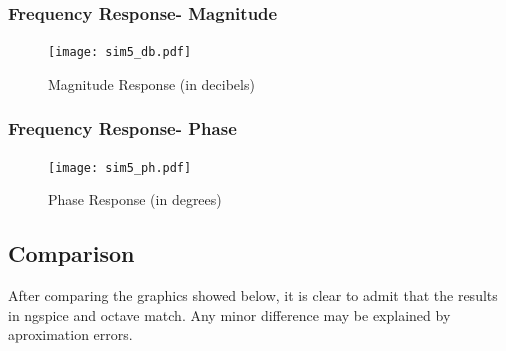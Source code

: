 \subsubsection{Frequency Response- Magnitude}

\begin{figure}[h] \centering
\texttt{[image: sim5\_db.pdf]}
\caption{Magnitude Response (in decibels)}
\label{fig:sim5_db}
\end{figure}

\subsubsection{Frequency Response- Phase}


\begin{figure}[h] \centering
\texttt{[image: sim5\_ph.pdf]}
\caption{Phase Response (in degrees)}
\label{fig:sim5_ph}
\end{figure}
\newpage


\subsection{Comparison}
After comparing the graphics showed below, it is clear to admit that the results in ngspice and octave match. Any minor difference may be explained by aproximation errors.












